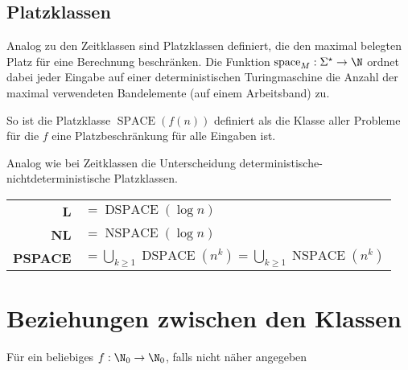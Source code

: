 \subsection{Platzklassen}
Analog zu den Zeitklassen sind Platzklassen definiert, die den maximal belegten Platz für eine Berechnung beschränken. Die Funktion $\mathrm{space}_M:\Sigma^\star\rightarrow \N$ ordnet dabei jeder Eingabe auf einer deterministischen Turingmaschine die Anzahl der maximal verwendeten Bandelemente (auf einem Arbeitsband) zu.

So ist die Platzklasse $\operatorname{SPACE}(f(n))$ definiert als die Klasse aller Probleme für die $f$ eine Platzbeschränkung für alle Eingaben ist.

Analog wie bei Zeitklassen die Unterscheidung deterministische-nichtdeterministische Platzklassen.
\begin{center}
	\renewcommand{\arraystretch}{2}
	\begin{tabular}{rl}
		\textbf{L}&$=\operatorname{DSPACE}(\log n)$\\
		\textbf{NL}&$=\operatorname{NSPACE}(\log n)$\\
		\textbf{PSPACE}&$=\displaystyle\bigcup_{k\geq 1} \operatorname{DSPACE}(n^k)=\bigcup_{k\geq 1} \operatorname{NSPACE}(n^k)$
	\end{tabular}
\end{center}

\section{Beziehungen zwischen den Klassen}
Für ein beliebiges $f:\N_0\rightarrow\N_0$, falls nicht näher angegeben
